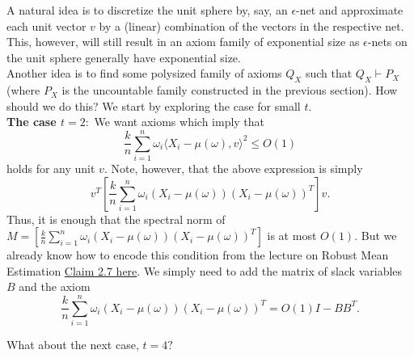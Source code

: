 \documentclass[12pt]{article}%
\begin{document}
\noindent
A natural idea is to discretize the unit sphere by, say, an $\epsilon$-net and approximate each unit vector $v$ by a (linear) combination of the vectors in the respective net. This, however, will still result in an axiom family of exponential size as $\epsilon$-nets on the unit sphere generally have exponential size.\\

\noindent
Another idea is to find some polysized family of axioms
$Q_X$ such that $Q_X\vdash P_X$ (where $P_X$ is the uncountable family constructed in the previous section). How should we do this? We start by exploring the case for small $t.$\\

\noindent
\textbf{The case $t = 2:$ }We want axioms which imply that
$$
\frac{k}{n}
\sum^n_{i=1} \omega_i 
\langle X_i - \mu(\omega), 
v\rangle ^2 \le O(1)
$$
holds for any unit $v.$ Note, however, that the above expression is simply 
$$
v^T\left[
\frac{k}{n}
\sum^n_{i=1} \omega_i
(X_i - \mu(\omega))
(X_i - \mu(\omega))^T
\right]v.
$$
Thus, it is enough that the spectral norm of 
$\displaystyle M = \left[
\frac{k}{n}
\sum^n_{i=1} \omega_i
(X_i - \mu(\omega))
(X_i - \mu(\omega))^T
\right]
$ is at most $O(1).$ But we already know how to encode this condition from the lecture on Robust Mean Estimation 
\href{https://tselilschramm.org/sos-paradigm/notes22/00-proofs-to-algs.pdf}{Claim 2.7 here}. We simply need to add the matrix of slack variables $B$ and the axiom $$
\frac{k}{n}
\sum^n_{i=1} \omega_i
(X_i - \mu(\omega))
(X_i - \mu(\omega))^T = 
O(1)I - BB^T.
$$

\noindent
What about the next case, $t = 4?$
\end{document}
